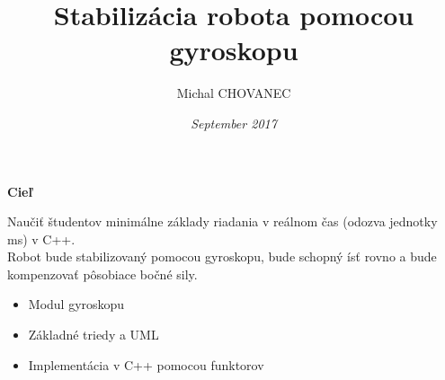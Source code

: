 \documentclass[xcolor=dvipsnames]{beamer}
\title{\bf Stabilizácia robota pomocou gyroskopu}
\author{Michal CHOVANEC}
\date[EURP]{\it September 2017}
\begin{document}
\begin{frame}
\titlepage
\end{frame}



\begin{frame}{\bf Cieľ}

  Naučiť študentov minimálne základy riadania v reálnom čas (odozva jednotky ms) v C++.\\
  Robot bude stabilizovaný pomocou gyroskopu, bude schopný ísť rovno a bude kompenzovať
  pôsobiace bočné sily.

    \begin{itemize}
      \item Modul gyroskopu
      \item Základné triedy a UML
      \item Implementácia v C++ pomocou funktorov
    \end{itemize}

\end{frame}
\end{document}
